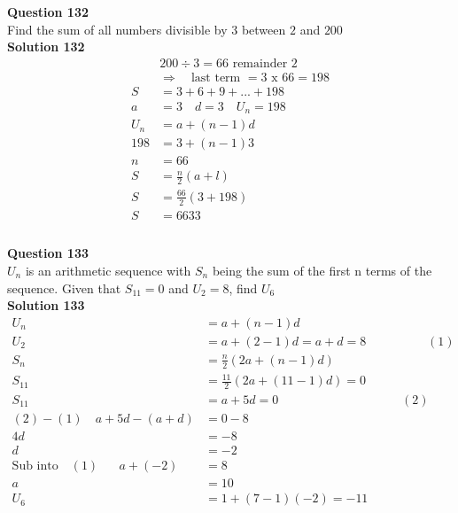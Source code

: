\documentclass{article}
\begin{document}
\noindent\textbf{Question 132}\\[5pt]
Find the sum of all numbers divisible by 3 between $2$ and $200$\\[5pt]
\noindent\textbf{Solution 132}\\[5pt]
\begin{align*}
&200 \div 3 = 66 \,\, \text{remainder}\,\, 2\\[2pt]
&\Rightarrow \quad \text{last term }= 3 \,\,\text{x}\,\, 66=198\\[2pt]
S&=3+6+9+...+198\\[12pt]
a&=3\quad d=3 \quad U_n=198\\[2pt]
U_n&=a+(n-1)d\\[2pt]
198&=3+(n-1)3\\[2pt]
n&=66\\[12pt]
S&=\displaystyle\frac{n}{2}(a+l)\\[2pt]
S&=\displaystyle\frac{66}{2}(3+198)\\[2pt]
S&=6633\\
\end{align*}\\[10pt]

\noindent\textbf{Question 133}\\[5pt]
$U_n$ is an arithmetic sequence with $S_n$ being the sum of the first n terms of the sequence. Given that $S_{11}=0$ and $U_2=8$, find $U_{6}$\\[5pt]
\noindent\textbf{Solution 133}\\[5pt]
\begin{align*}
U_n&=a+(n-1)d\\[2pt]
U_2&=a+(2-1)d=a+d=8\hspace{59pt} (1)\\[2pt]
S_n&=\displaystyle\frac{n}{2}(2a+(n-1)d)\\[2pt]
S_{11}&=\displaystyle\frac{11}{2}(2a+(11-1)d)=0\\[2pt]
S_{11}&=a+5d=0\hspace{119pt} (2)\\[2pt]
(2)-(1)\quad a+5d-(a+d)&=0-8\\[2pt]
4d&=-8\\[2pt]
d&=-2\\[2pt]
\text{Sub into} \quad (1) \hspace{20pt} a+(-2)&=8\\[2pt]
a&=10\\[12pt]
U_{6}&=1+(7-1)(-2)=-11\\[2pt]
\end{align*}\\[10pt]
\end{document}

